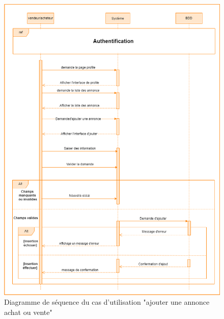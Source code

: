 \documentclass[edit,12pt,a4paper,ChapStyle,oneside,doubleinterligne]{report}
\begin{document}
\begin{figure}[h!]\label{fig:Diagramme cas 6}
\centering
\includegraphics[width=1\textwidth]{images/ajouter annonce.png}
\caption{Diagramme de séquence du cas d'utilisation "ajouter une annonce achat ou vente"}
\end{figure}

\clearpage
\end{document}
